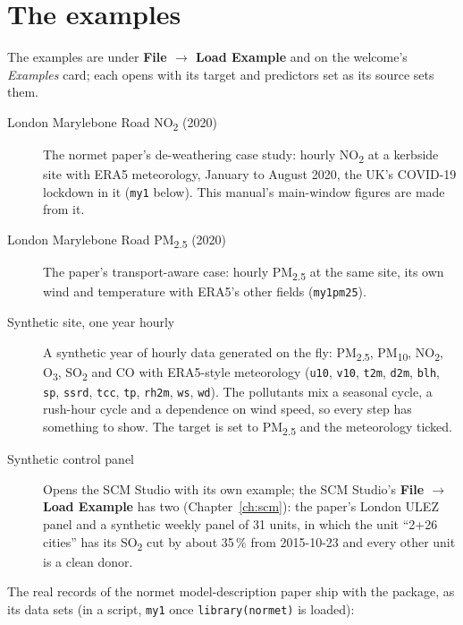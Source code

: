\documentclass[11pt]{report}
\newcommand{\nm}{\textsf{normet}}
\newcommand{\codeunderscore}{\textunderscore\allowbreak}
\newcommand{\code}[1]{\texttt{\let\_\codeunderscore #1}}
\newcommand{\tab}[1]{\textbf{#1}}
\newcommand{\NOtwo}{NO\textsubscript{2}}
\newcommand{\PMtwo}{PM\textsubscript{2.5}}
\begin{document}
\section{The examples}\label{sec:examples}
The examples are under \tab{File $\rightarrow$ Load Example} and on the
welcome's \emph{Examples} card; each opens with its target and predictors set as its
source sets them.
\begin{description}
  \item[London Marylebone Road \NOtwo{} (2020)] The \nm{} paper's de-weathering case
        study: hourly \NOtwo{} at a kerbside site with ERA5 meteorology, January to August
        2020, the UK's COVID-19 lockdown in it (\code{my1} below). This manual's
        main-window figures are made from it.
  \item[London Marylebone Road \PMtwo{} (2020)] The paper's transport-aware case: hourly
        \PMtwo{} at the same site, its own wind and temperature with ERA5's other fields
        (\code{my1\_pm25}).
  \item[Synthetic site, one year hourly] A synthetic year of hourly data generated on the fly: \PMtwo{}, PM\textsubscript{10},
        \NOtwo{}, O\textsubscript{3}, SO\textsubscript{2} and CO with ERA5-style
        meteorology (\code{u10}, \code{v10}, \code{t2m}, \code{d2m}, \code{blh},
        \code{sp}, \code{ssrd}, \code{tcc}, \code{tp}, \code{rh2m}, \code{ws},
        \code{wd}). The pollutants mix a seasonal cycle, a rush-hour cycle and a
        dependence on wind speed, so every step has something to show. The target is set
        to \PMtwo{} and the meteorology ticked.
  \item[Synthetic control panel] Opens the SCM Studio with its own example; the SCM
        Studio's \tab{File $\rightarrow$ Load Example} has two (Chapter~\ref{ch:scm}): the
        paper's London ULEZ panel and a synthetic weekly panel of 31 units, in which the
        unit ``2+26 cities'' has its SO\textsubscript{2} cut by about 35\,\% from 2015-10-23
        and every other unit is a clean donor.
\end{description}
The real records of the \nm{} model-description paper ship with the package, as its data
sets (in a script, \code{my1} once \code{library(normet)} is loaded):
\end{document}
